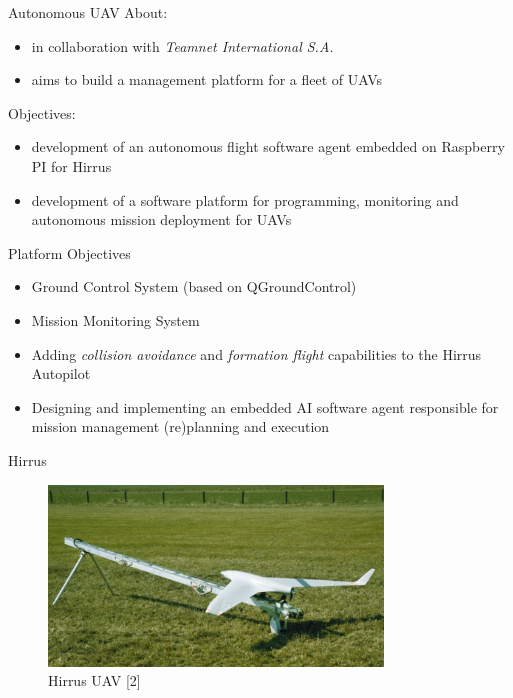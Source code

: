 \documentclass{beamer}
\begin{document}
\begin{frame}{Autonomous UAV}
About:
\begin{itemize}
\item in collaboration with \textit{Teamnet International S.A.}
\item aims to build a management platform for a fleet of UAVs
\end{itemize}
Objectives:
\begin{itemize}
\item development of an autonomous flight software agent embedded on Raspberry PI
for Hirrus
\item development of a software platform for programming, monitoring and autonomous mission deployment for UAVs
\end{itemize}
\end{frame}

\begin{frame}{Platform Objectives}
\begin{itemize}
\item Ground Control System (based on QGroundControl)
\item Mission Monitoring System
\item Adding \textit{collision avoidance} and \textit{formation flight} capabilities to the Hirrus Autopilot
\item Designing and implementing an embedded AI software agent responsible for mission management (re)planning and execution
\end{itemize}
\end{frame}

\begin{frame}{Hirrus}
\begin{center}
\begin{figure}[p]
\includegraphics[width=3.5in]{img/hirrus.jpg}
\caption{Hirrus UAV [2]}
\end{figure}
\end{center}
\end{frame}
\end{document}
